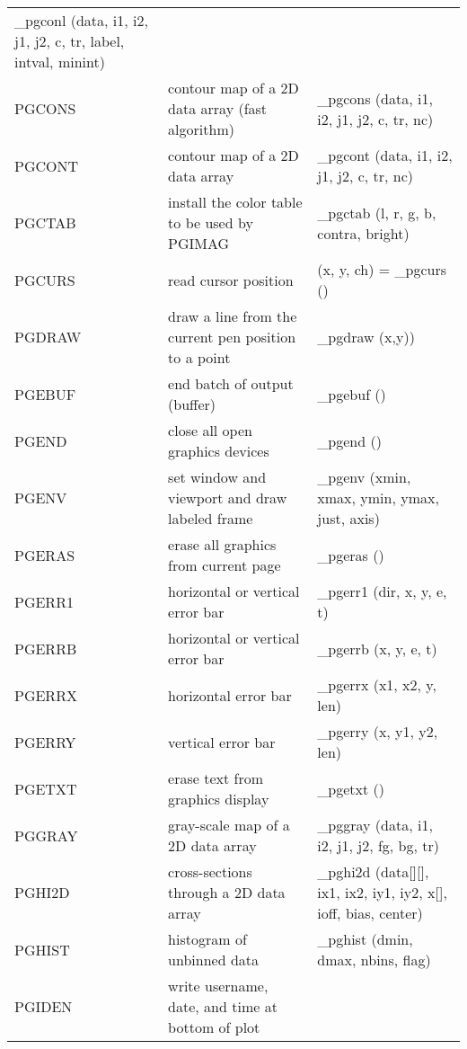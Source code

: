 \documentclass{book}
\begin{document}
\begin{center}
\begin{tabular}{|l|p{2.5in}|p{2.25in}|}
\_pgconl (data, i1, i2, j1, j2, c, tr, label, intval, minint) \\
PGCONS & contour map of a 2D data array  (fast algorithm)       &
\_pgcons (data, i1, i2, j1, j2, c, tr, nc) \\
PGCONT & contour map of a 2D data array                                 &
\_pgcont (data, i1, i2, j1, j2, c, tr, nc) \\
PGCTAB & install the color table to be used by PGIMAG            &
\_pgctab (l, r, g, b, contra, bright) \\
PGCURS & read cursor position                                              &
(x, y, ch) = \_pgcurs () \\
PGDRAW & draw a line from the current pen position to a point           &
\_pgdraw (x,y)) \\
PGEBUF & end batch of output (buffer)                                   &
\_pgebuf () \\
PGEND & close all open graphics devices                                 &
\_pgend () \\
PGENV & set window and viewport and draw labeled frame                  &
\_pgenv (xmin, xmax, ymin, ymax, just, axis) \\
PGERAS & erase all graphics from current page                           &
\_pgeras () \\
PGERR1 & horizontal or vertical error bar                               &
\_pgerr1 (dir, x, y, e, t) \\
PGERRB & horizontal or vertical error bar                               &
\_pgerrb (x, y, e, t) \\
PGERRX & horizontal error bar                                           &
\_pgerrx (x1, x2, y, len) \\
PGERRY & vertical error bar                                             &
\_pgerry (x, y1, y2, len) \\
PGETXT & erase text from graphics display                               &
\_pgetxt () \\
PGGRAY & gray-scale map of a 2D data array                                     &
\_pggray (data, i1, i2, j1, j2, fg, bg, tr) \\
PGHI2D & cross-sections through a 2D data array                         &
\_pghi2d (data[][], ix1, ix2, iy1, iy2, x[], ioff, bias, center) \\
PGHIST & histogram of unbinned data                                     &
\_pghist (dmin, dmax, nbins, flag) \\
PGIDEN & write username, date, and time at bottom of plot               &

\end{tabular}
\end{center}
\end{document}
